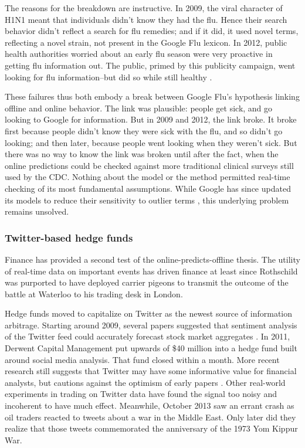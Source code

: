 \documentclass{article}
\begin{document}
The reasons for the breakdown are instructive. In 2009, the viral
character of H1N1 meant that individuals didn't know they had the
flu. Hence their search behavior didn't reflect a search for flu
remedies; and if it did, it used novel terms, reflecting a novel
strain, not present in the Google Flu lexicon. In 2012, public health
authorities worried about an early flu season were very proactive in
getting flu information out. The public, primed by this publicity
campaign, went looking for flu information--but did so while still healthy
\citep{butler2013google}.

These failures thus both embody a break between Google Flu's 
hypothesis linking offline and online behavior. The link was
plausible: people get sick, and go looking to Google for
information. But in 2009 and 2012, the link broke. It broke first
because people didn't know they were sick with the flu, and so didn't
go looking; and then later, because people went looking when they
weren't sick. But there was no way to know the link was broken until
after the fact, when the online predictions could be checked against
more traditional clinical surveys still used by the CDC. Nothing about
the model or the method permitted real-time checking of its most
fundamental assumptions. While Google has since updated its models to
reduce their sensitivity to outlier terms \citep{41763}, this
underlying problem remains unsolved.

\subsubsection{Twitter-based hedge funds}
\label{sec:twitter-based-hedge}

Finance has provided a second test of the online-predicts-offline
thesis. The utility of real-time data on important events has driven
finance at least since Rothschild was purported to have deployed
carrier pigeons to transmit the outcome of the battle at Waterloo to
his trading desk in London. 

Hedge funds moved to capitalize on Twitter as the newest source of
information arbitrage. Starting around 2009, several papers suggested
that sentiment analysis of the Twitter feed could accurately forecast
stock market aggregates
\citep{bollen2011twitter,zhang2011predicting}. In 2011, 
Derwent Capital Management put upwards of \$40 million into a hedge
fund built around social media analysis. That fund closed within a
month. More recent research still suggests that Twitter may have some
informative value for financial analysts, but cautions against the
optimism of early papers \citep{mackintosh2013}. Other real-world
experiments in trading on Twitter data have found the signal too noisy
and incoherent to have much effect. Meanwhile, October
2013 saw an errant crash as oil traders reacted to tweets about a war in
the Middle East. Only later did they realize that those tweets
commemorated the anniversary of the 1973 Yom Kippur War. 
\end{document}
